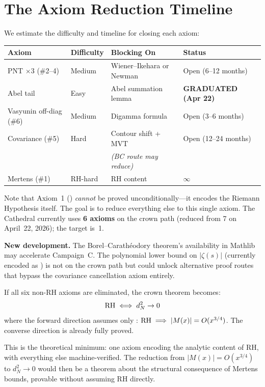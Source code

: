 \documentclass[11pt,a4paper]{article}
\begin{document}
\section{The Axiom Reduction Timeline}
\label{sec:timeline}

We estimate the difficulty and timeline for closing each axiom:

\begin{center}
\small
\begin{tabular}{@{}llll@{}}
\toprule
\textbf{Axiom} & \textbf{Difficulty} & \textbf{Blocking On} & \textbf{Status} \\
\midrule
PNT $\times 3$ (\#2--4) & Medium & Wiener--Ikehara or Newman & Open (6--12 months) \\
\rowcolor{green!10}
Abel tail & Easy & Abel summation lemma & \textbf{GRADUATED (Apr 22)} \\
Vasyunin off-diag (\#6) & Medium & Digamma formula & Open (3--6 months) \\
Covariance (\#5) & Hard & Contour shift + MVT & Open (12--24 months) \\
& & \textit{(BC route may reduce)} & \\
Mertens (\#1) & RH-hard & RH content & $\infty$ \\
\bottomrule
\end{tabular}
\end{center}

Note that Axiom~1 () \emph{cannot} be
proved unconditionally---it encodes the Riemann Hypothesis itself.
The goal is to reduce everything else to this single axiom. The
Cathedral currently uses \textbf{6 axioms} on the crown path (reduced from 7
on April~22, 2026); the target is~1.

\textbf{New development.} The Borel--Carath\'eodory theorem's availability
in Mathlib may accelerate Campaign~C. The polynomial lower bound on
$|\zeta(s)|$ (currently encoded as )
is not on the crown path but could unlock alternative proof routes that
bypass the covariance cancellation axiom entirely.

\begin{remark}
If all six non-RH axioms are eliminated, the crown theorem becomes:
\[
  \mathrm{RH} \iff d_N^2 \to 0
\]
where the forward direction assumes only
: $\mathrm{RH} \implies |M(x)| = O(x^{3/4})$.
The converse direction is already fully proved.

This is the theoretical minimum: one axiom encoding the analytic content
of RH, with everything else machine-verified. The reduction from
$|M(x)| = O(x^{3/4})$ to $d_N^2 \to 0$ would then be a theorem about
the structural consequence of Mertens bounds, provable without assuming
RH directly.
\end{remark}
\end{document}
